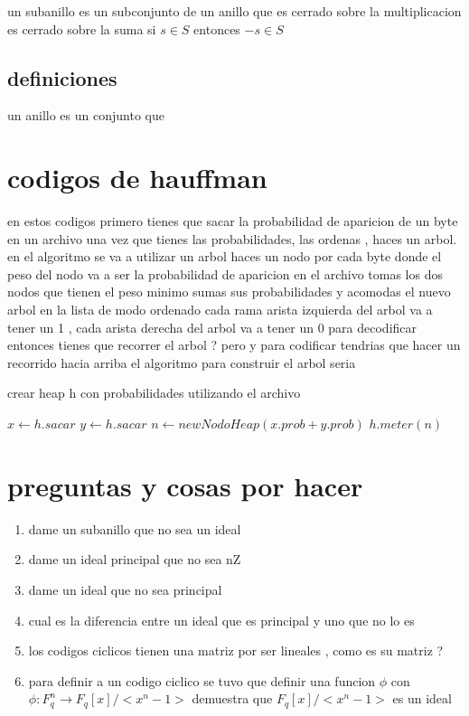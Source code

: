 \documentclass[12p]{article}
\begin{document}
un subanillo es un subconjunto de un anillo que
es cerrado sobre la multiplicacion
es cerrado sobre la suma
si $s \in S$ entonces $-s \in S$
\subsection{definiciones}
un anillo es un conjunto que
\section{codigos de hauffman}
en estos codigos primero tienes que sacar la probabilidad de aparicion de un byte en un archivo 
una vez que tienes las probabilidades, las ordenas , haces un arbol. 
en el algoritmo se va a utilizar un arbol 
haces un nodo por cada byte donde el peso del nodo va a ser la probabilidad de aparicion en el archivo 
tomas los dos nodos que tienen el peso minimo 
sumas sus probabilidades y acomodas el nuevo arbol en la lista de modo ordenado 
cada rama arista izquierda del arbol va a tener un 1 , cada arista derecha del arbol va a tener un 0 
para decodificar entonces tienes que recorrer el arbol ?
pero y para codificar tendrias que hacer un recorrido hacia arriba
el algoritmo para construir el arbol seria 

crear heap h con probabilidades utilizando el archivo 
\begin{algorithmic}
  \STATE  $x \leftarrow h.sacar $
  \STATE  $y \leftarrow h.sacar $
  \STATE  $n \leftarrow new NodoHeap(x.prob + y.prob) $
  \STATE  $h.meter(n)$
  \ENDWHILE
\end{algorithmic}
\section{preguntas y cosas por hacer}
\begin{enumerate}
\item dame un subanillo que no sea un ideal \\ 
\item dame un ideal principal que no sea nZ \\ 
\item dame un ideal que no sea principal \\ 
\item cual es la diferencia entre un ideal que es principal y uno que no lo es \\ 
\item los codigos ciclicos tienen una matriz por ser lineales , como es su matriz ? \\
\item para definir a un codigo ciclico se tuvo que definir una funcion $\phi$ con $\phi : F_q^ n \rightarrow F_q[x]/<x^n - 1>$
  demuestra que $F _ q [x]/<x^n - 1 >$ es un ideal 
\end{enumerate}
\end{document}
